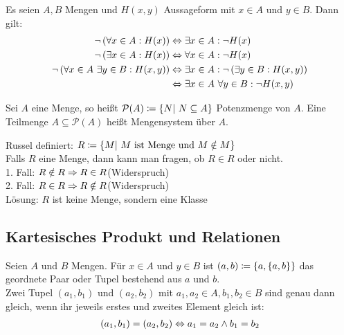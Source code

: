 \begin{folgerung}
    Es seien $A,B$ Mengen und $H(x,y)$ Aussageform mit $x\in A$ und $y \in B$. Dann gilt:
    \begin{align*}
        \neg\left(\forall x \in A: H(x)\right) &\Leftrightarrow{} \exists x\in A: \neg H(x)\\
        \neg\left(\exists x \in A: H(x)\right) &\Leftrightarrow{} \forall x\in A: \neg H(x)\\
        \neg \left(\forall x \in A~\exists y\in B: H(x,y)\right)&\Leftrightarrow{}\exists x \in A: \neg\left(\exists y\in B: H(x,y)\right)\\
        &\Leftrightarrow{} \exists x\in A~\forall y \in B: \neg H(x,y)\\
    \end{align*}
\end{folgerung}

\begin{definition}[Potenzmenge]
    Sei $A$ eine Menge, so heißt $\mathcal{P}(A) \coloneqq \left\{N|~N \subseteq A\right\}$ Potenzmenge von $A$. Eine Teilmenge $A\subseteq \mathcal{P}(A)$ heißt Mengensystem über $A$.
\end{definition}

\begin{bemerkung}
    Russel definiert: $R\coloneqq\left\{M|~M \text{ ist Menge und $M \notin M$}\right\}$\\
    Falls $R$ eine Menge, dann kann man fragen, ob $R\in R$ oder nicht.\\
    1. Fall: $R\notin R\Rightarrow{} R\in R$\qquad (Widerspruch)\\
    2. Fall: $R\in R\Rightarrow{} R \notin R$\qquad (Widerspruch)\\
    Lösung: $R$ ist keine Menge, sondern eine Klasse
\end{bemerkung}

\subsection{Kartesisches Produkt und Relationen}

\begin{definition}[Tupel]
    Seien $A$ und $B$ Mengen. Für $x\in A$ und $y\in B$ ist $(a,b) \coloneqq \left\{a, \left\{a,b\right\}\right\}$ das geordnete Paar oder Tupel bestehend aus $a$ und $b$.\\[10pt]
    Zwei Tupel $(a_1, b_1)$ und $(a_2, b_2)$ mit $a_1, a_2\in A, b_1, b_2\in B$ sind genau dann gleich, wenn ihr jeweils erstes und zweites Element gleich ist:
    \begin{align*}
    (a_1, b_1)
        = (a_2, b_2) \Leftrightarrow{} a_1 = a_2 \land b_1 = b_2
    \end{align*}
\end{definition}

